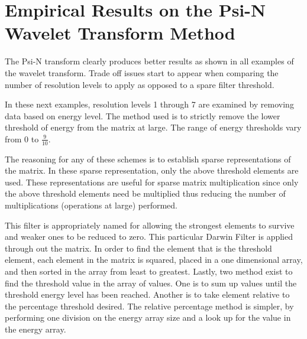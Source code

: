 \section {Empirical Results on the Psi-N Wavelet Transform Method}
The Psi-N transform clearly produces better results as shown in all examples of the wavelet transform.  Trade off issues start to appear when comparing the number of resolution levels to apply as opposed to a spare filter threshold.   

In these next examples, resolution levels 1 through 7 are examined by removing data based on energy level.  The method used is to strictly remove the lower threshold of energy from the matrix at large.  %
The range of energy thresholds vary from 0 to $\frac{9}{10}$. 

The reasoning for any of these schemes is to establish sparse representations of the matrix.  In these sparse representation, only the above threshold elements are used.   These representations are useful for sparse matrix multiplication since only the above threshold elements need be multiplied thus reducing the number of multiplications (operations at large) performed.  

This filter is appropriately named for allowing the strongest elements to survive and weaker ones to be reduced to zero.  This particular Darwin Filter is applied through out the matrix.  In order to find the element that is the threshold element, each element in the matrix is squared, placed in a one dimensional array, and then sorted in the array from least to greatest.  %
Lastly, two method exist to find the threshold value in the array of values.  One is to sum up values until the threshold energy level has been reached.  Another is to take element relative to the percentage threshold desired.  The relative percentage method is simpler, by performing one division on the energy array size and a look up for the value in the energy array.  

